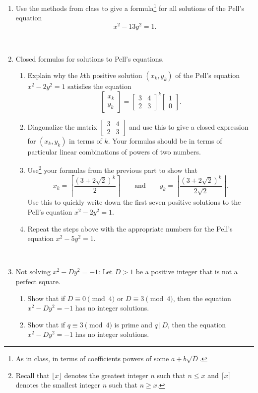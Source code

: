 \documentclass{amsart}
\begin{document}
\begin{enumerate}

\item Use the methods from class to give a formula\footnote{As in class, in terms of coefficients powers of some $a+b\sqrt{D}$.} for all solutions of the Pell's equation
\[ x^2 - 13 y^2 = 1.\]

\

\item Closed formulas for solutions to Pell's equations.
\begin{enumerate}
\item Explain why the $k$th positive solution $(x_k,y_k)$ of the Pell's equation $x^2 - 2y^2=1$ satisfies the equation
\[ \begin{bmatrix} x_k \\ y_k \end{bmatrix} = \begin{bmatrix} 3 & 4 \\ 2 & 3\end{bmatrix}^k \begin{bmatrix} 1 \\ 0\end{bmatrix}.\]
\item Diagonalize the matrix $\begin{bmatrix} 3 & 4 \\ 2 & 3\end{bmatrix}$ and use this to give a closed expression for $(x_k,y_k)$ in terms of $k$. Your formulas should be in terms of particular linear combinations of powers of two numbers.
\item Use\footnote{Recall that $\lfloor x \rfloor$ denotes the greatest integer $n$ such that $n\leq x$ and $\lceil x \rceil$ denotes the smallest integer $n$ such that $n\geq x$.} your formulas from the previous part to show that 
\[ x_k =\left\lceil \frac{(3+ 2\sqrt{2})^k}{2} \right\rceil \qquad\text{and}\qquad y_k =\left\lfloor \frac{(3+2\sqrt{2})^k}{2\sqrt{2}} \right\rfloor.\]
Use this to quickly write down the first seven positive solutions to the Pell's equation $x^2 - 2y^2=1$.
\item Repeat the steps above with the appropriate numbers for the Pell's equation $x^2 - 5y^2=1$.
\end{enumerate}


\

\item Not solving $x^2 - D y^2 = -1$: Let $D>1$ be a positive integer that is not a perfect square.
\begin{enumerate}
\item Show that if $D\equiv 0 \pmod{4}$ or $D\equiv 3 \pmod{4}$, then the equation $x^2 - Dy^2 = -1$ has no integer solutions.
\item Show that if $q\equiv 3 \pmod{4}$ is prime and $q\,|\,D$, then the equation $x^2 - Dy^2 = -1$ has no integer solutions.
\end{enumerate}



\end{enumerate}
\end{document}
